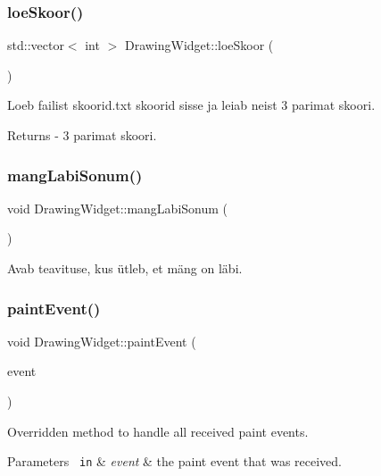 \subsubsection{\texorpdfstring{loeSkoor()}{loeSkoor()}}
{\footnotesize\ttfamily std\+::vector$<$ int $>$ Drawing\+Widget\+::loe\+Skoor (\begin{DoxyParamCaption}{ }\end{DoxyParamCaption})}

Loeb failist skoorid.\+txt skoorid sisse ja leiab neist 3 parimat skoori. \begin{DoxyReturn}{Returns}
-\/ 3 parimat skoori. 
\end{DoxyReturn}
\mbox{\label{class_drawing_widget_adf712171903e9b499388e7879f0630b3}} 
\subsubsection{\texorpdfstring{mangLabiSonum()}{mangLabiSonum()}}
{\footnotesize\ttfamily void Drawing\+Widget\+::mang\+Labi\+Sonum (\begin{DoxyParamCaption}{ }\end{DoxyParamCaption})\hspace{0.3cm}{\ttfamily [protected]}}

Avab teavituse, kus ütleb, et mäng on läbi. \mbox{\label{class_drawing_widget_acfae26f9320f7b4f0c425709514d2b5b}} 
\subsubsection{\texorpdfstring{paintEvent()}{paintEvent()}}
{\footnotesize\ttfamily void Drawing\+Widget\+::paint\+Event (\begin{DoxyParamCaption}\item[{Q\+Paint\+Event $\ast$}]{event }\end{DoxyParamCaption})\hspace{0.3cm}{\ttfamily [protected]}}

Overridden method to handle all received paint events. 
\begin{DoxyParams}[1]{Parameters}
\mbox{\texttt{ in}}  & {\em event} & the paint event that was received. \\
\hline
\end{DoxyParams}
\mbox{\label{class_drawing_widget_a67029aecb77034dbe211b953ce053606}} 
